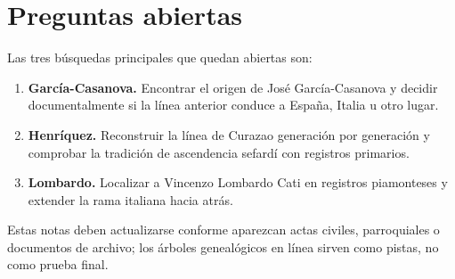 \section{Preguntas abiertas}
\label{section-genealogia-preguntas-abiertas}

Las tres búsquedas principales que quedan abiertas
son:

\begin{enumerate}
\item \textbf{García-Casanova.} Encontrar el origen
de José García-Casanova y decidir documentalmente
si la línea anterior conduce a España, Italia u
otro lugar.
\item \textbf{Henríquez.} Reconstruir la línea de
Curazao generación por generación y comprobar la
tradición de ascendencia sefardí con registros
primarios.
\item \textbf{Lombardo.} Localizar a Vincenzo
Lombardo Cati en registros piamonteses y extender
la rama italiana hacia atrás.
\end{enumerate}

Estas notas deben actualizarse conforme aparezcan
actas civiles, parroquiales o documentos de archivo;
los árboles genealógicos en línea sirven como pistas,
no como prueba final.






